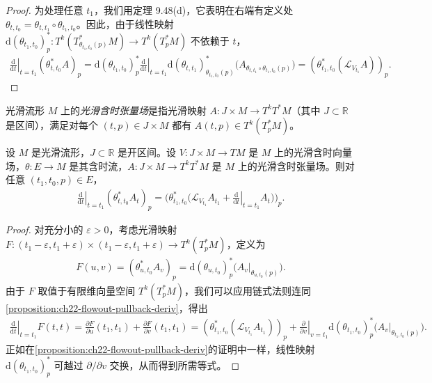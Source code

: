 \documentclass[../../main.tex]{subfiles}
\begin{document}
\begin{proof}
为处理任意 $t_1$，我们用定理 9.48(d)，它表明在右端有定义处 $\theta_{t,t_0}=\theta_{t,t_1}\circ\theta_{t_1,t_0}$。因此，由于线性映射 $\mathrm{d}(\theta_{t_1,t_0})^*_p:T^k(T^*_{\theta_{t_1,t_0}(p)}M)\to T^k(T^*_pM)$ 不依赖于 $t$，
\begin{align*}
\left.\frac{\mathrm{d}}{\mathrm{d}t}\right|_{t=t_1}(\theta_{t,t_0}^*A)_p
=\mathrm{d}(\theta_{t_1,t_0})^*_p\left.\frac{\mathrm{d}}{\mathrm{d}t}\right|_{t=t_1}
\mathrm{d}(\theta_{t,t_1})^*_{\theta_{t_1,t_0}(p)}\big(A_{\theta_{t,t_1}\circ\theta_{t_1,t_0}(p)}\big)
=(\theta_{t_1,t_0}^*(\mathcal L_{V_{t_1}}A))_p.
\end{align*}
\end{proof}

光滑流形 $M$ 上的\emph{光滑含时张量场}是指光滑映射 $A:J\times M\to T^kT^*M$（其中 $J\subset\mathbb R$ 是区间），满足对每个 $(t,p)\in J\times M$ 都有 $A(t,p)\in T^k(T^*_pM)$。

\begin{proposition}\label{proposition:ch22-time-dependent-tensor}
设 $M$ 是光滑流形，$J\subset\mathbb R$ 是开区间。设 $V:J\times M\to TM$ 是 $M$ 上的光滑含时向量场，$\theta:E\to M$ 是其含时流，$A:J\times M\to T^kT^*M$ 是 $M$ 上的光滑含时张量场。则对任意 $(t_1,t_0,p)\in E$，
\begin{align}
\left.\frac{\mathrm{d}}{\mathrm{d}t}\right|_{t=t_1}(\theta_{t,t_0}^*A_t)_p
=\Big(\theta_{t_1,t_0}^*\big(\mathcal L_{V_{t_1}}A_{t_1}
+\left.\frac{\mathrm{d}}{\mathrm{d}t}\right|_{t=t_1}A_t\big)\Big)_p.
\end{align}
\end{proposition}

\begin{proof}
对充分小的 $\varepsilon>0$，考虑光滑映射 $F:(t_1-\varepsilon,t_1+\varepsilon)\times(t_1-\varepsilon,t_1+\varepsilon)\to T^k(T^*_pM)$，定义为
\begin{align*}
F(u,v)=(\theta_{u,t_0}^*A_v)_p
=\mathrm{d}(\theta_{u,t_0})^*_p\big(A_v|_{\theta_{u,t_0}(p)}\big).
\end{align*}
由于 $F$ 取值于有限维向量空间 $T^k(T^*_pM)$，我们可以应用链式法则连同\cref{proposition:ch22-flowout-pullback-deriv}，得出
\begin{align*}
\left.\frac{\mathrm{d}}{\mathrm{d}t}\right|_{t=t_1}F(t,t)
=\frac{\partial F}{\partial u}(t_1,t_1)+\frac{\partial F}{\partial v}(t_1,t_1)
=(\theta_{t_1,t_0}^*(\mathcal L_{V_{t_1}}A_{t_1}))_p
+\left.\frac{\partial}{\partial v}\right|_{v=t_1}\mathrm{d}(\theta_{t_1,t_0})^*_p
\big(A_v|_{\theta_{t_1,t_0}(p)}\big).
\end{align*}
正如在\cref{proposition:ch22-flowout-pullback-deriv}的证明中一样，线性映射 $\mathrm{d}(\theta_{t_1,t_0})^*_p$ 可越过 $\partial/\partial v$ 交换，从而得到所需等式。
\end{proof}
\end{document}
